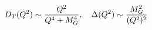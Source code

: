 \begin{equation}
  D_T(Q^2) \sim {Q^2 \over Q^4+M_G^4}  , \quad 
 \Delta(Q^2) \sim {M_G^2 \over (Q^2)^{2}}  
\end{equation}

